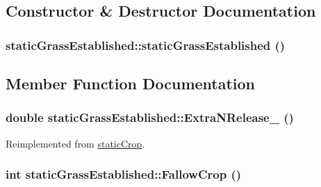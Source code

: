 \subsection{Constructor \& Destructor Documentation}
\hypertarget{classstatic_grass_established_a799a347dd301965b7d1b24be5cf35e44}{
\subsubsection[{staticGrassEstablished}]{\setlength{\rightskip}{0pt plus 5cm}staticGrassEstablished::staticGrassEstablished ()}}
\label{classstatic_grass_established_a799a347dd301965b7d1b24be5cf35e44}


\subsection{Member Function Documentation}
\hypertarget{classstatic_grass_established_ace876335a825ca2710ab2adfbab12a44}{
\subsubsection[{ExtraNRelease\_\-}]{\setlength{\rightskip}{0pt plus 5cm}double staticGrassEstablished::ExtraNRelease\_\- ()}}
\label{classstatic_grass_established_ace876335a825ca2710ab2adfbab12a44}


Reimplemented from \hyperlink{classstatic_crop_afe0cb8a7831afa941a37338f05227d67}{staticCrop}.\hypertarget{classstatic_grass_established_a40f7a2c745566b2a31813dd597fcdce4}{
\subsubsection[{FallowCrop}]{\setlength{\rightskip}{0pt plus 5cm}int staticGrassEstablished::FallowCrop ()}}
\label{classstatic_grass_established_a40f7a2c745566b2a31813dd597fcdce4}


